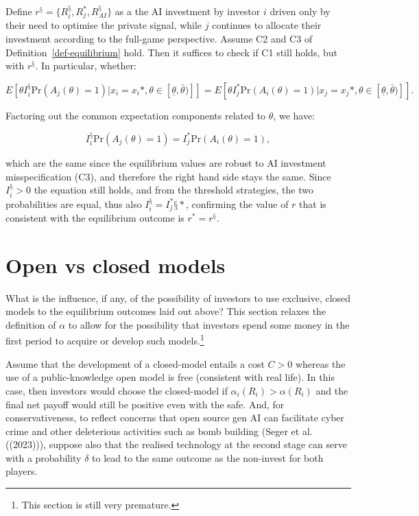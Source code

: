 \documentclass[
]{article}
\theoremstyle{plain}
\theoremstyle{definition}
\theoremstyle{remark}
\begin{document}
Define \(r^§ = \{R_i^§, R_j^*, R_{AI}^§\}\) as a the AI investment by
investor \(i\) driven only by their need to optimise the private signal,
while \(j\) continues to allocate their investment according to the
full-game perspective. Assume C2 and C3 of
Definition~\ref{def-equilibrium} hold. Then it suffices to check if C1
still holds, but with \(r^§\). In particular, whether:

\[
E[\theta I_i^§ \text{Pr}(A_j(\theta)=1) | x_i = x_i*, \theta \in [\underline{\theta}, \bar{\theta})]] = E[\theta I_j^* \text{Pr}(A_i(\theta)=1) | x_j = x_j*, \theta \in [\underline{\theta}, \bar{\theta})]].
\]

Factoring out the common expectation components related to \(\theta\),
we have:

\[
I_i^§ \text{Pr}(A_j(\theta)=1) = I_j^* \text{Pr}(A_i(\theta)=1),
\]

which are the same since the equilibrium values are robust to AI
investment misspecification (C3), and therefore the right hand side
stays the same. Since \(I_i^§ > 0\) the equation still holds, and from
the threshold strategies, the two probabilities are equal, thus also
\(I_i^§ = I_j^*§*\), confirming the value of \(r\) that is consistent
with the equilibrium outcome is \(r^* = r^§\).

\hypertarget{sec-closedmodels}{%
\section{Open vs closed models}\label{sec-closedmodels}}

What is the influence, if any, of the possibility of investors to use
exclusive, closed models to the equilibrium outcomes laid out above?
This section relaxes the definition of \(\alpha\) to allow for the
possibility that investors spend some money in the first period to
acquire or develop such models.\footnote{This section is still very
  premature.}

Assume that the development of a closed-model entails a cost \(C > 0\)
whereas the use of a public-knowledge open model is free (consistent
with real life). In this case, then investors would choose the
closed-model if \(\alpha_i(R_i) > \alpha(R_i)\) and the final net payoff
would still be positive even with the safe. And, for conservativeness,
to reflect concerns that open source gen AI can facilitate cyber crime
and other deleterious activities such as bomb building (Seger et al.
((2023))), suppose also that the realised technology at the second stage
can serve with a probability \(\delta\) to lead to the same outcome as
the non-invest for both players.
\end{document}
